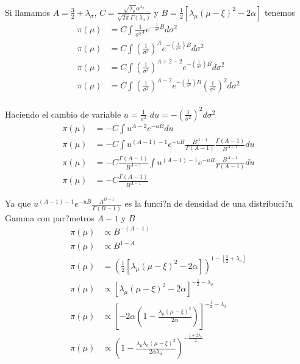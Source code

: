 \documentclass[12pt,]{article}
\begin{document}
Si llamamos \(A=\frac{3}{2}+\lambda_\sigma\),
\(C=\frac{\sqrt{\lambda_\mu}\alpha^{\lambda_\sigma}}{\sqrt{2\pi }\Gamma(\lambda_\sigma)}\)
y \(B=\frac{1}{2}[\lambda_\mu(\mu-\xi)^2-2\alpha]\) tenemos \[
\begin{array}{rl}
\pi(\mu) & =\displaystyle C \int \frac{1}{{\sigma^2}^A}e^{-\frac{1}{\sigma^2}B}d\sigma^2\\
\pi(\mu) & =\displaystyle C \int \left(\frac{1}{{\sigma^2}}\right)^Ae^{-(\frac{1}{\sigma^2})B}d\sigma^2\\
\pi(\mu) & =\displaystyle C \int \left(\frac{1}{{\sigma^2}}\right)^{A+2-2}e^{-(\frac{1}{\sigma^2})B}d\sigma^2\\
\pi(\mu) & =\displaystyle C \int \left(\frac{1}{{\sigma^2}}\right)^{A-2}e^{-(\frac{1}{\sigma^2})B}\left(\frac{1}{{\sigma^2}}\right)^2 d\sigma^2\\
\end{array}
\]

Haciendo el cambio de variable \(u=\frac{1}{\sigma^2}\)
\(du=-\left( \frac{1}{\sigma^2} \right)^2d\sigma^2\) \[
\begin{array}{rl}
\pi(\mu) & =\displaystyle -C \int u^{A-2}e^{-uB} du\\
\pi(\mu) & =\displaystyle -C \int u^{(A-1)-1}e^{-uB} \frac{B^{A-1}}{\Gamma(A-1)}\frac{\Gamma(A-1)}{B^{A-1}}du\\
\pi(\mu) & =\displaystyle -C\frac{\Gamma(A-1)}{B^{A-1}}
\int u^{(A-1)-1}e^{-uB} \frac{B^{A-1}}{\Gamma(A-1)}du\\
\pi(\mu) & =\displaystyle -C\frac{\Gamma(A-1)}{B^{A-1}}
\end{array}
\]

Ya que \(u^{(A-1)-1}e^{-uB} \frac{A^{B-1}}{\Gamma(B-1)}\) es la funci?n
de densidad de una distribuci?n Gamma con par?metros \(A-1\) y \(B\) \[
\begin{array}{rl}
\pi(\mu) & \propto B^{-(A-1)} \\
\pi(\mu) & \propto B^{1-A} \\
\pi(\mu) & = (\frac{1}{2}[\lambda_\mu(\mu-\xi)^2-2\alpha])^{1-[\frac{3}{2}+\lambda_\sigma]}\\
\pi(\mu) & \propto [\lambda_\mu(\mu-\xi)^2-2\alpha]^{-\frac{1}{2}-\lambda_\sigma}\\
\pi(\mu) & \propto [-2\alpha(1-\frac{\lambda_\mu(\mu-\xi)^2}{2\alpha})]^{-\frac{1}{2}-\lambda_\sigma}\\
\pi(\mu) & \propto (1-\frac{\lambda_\mu\lambda_\sigma(\mu-\xi)^2}{2\alpha\lambda_\sigma})^{-\frac{1+2\lambda_\sigma}{2}}
\end{array}
\]
\end{document}
